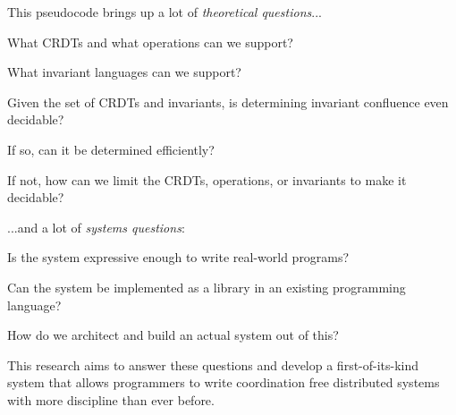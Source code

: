 This pseudocode brings up a lot of \emph{theoretical questions}...
\begin{inparaitem}
  \item What CRDTs and what operations can we support?
  \item What invariant languages can we support?
  \item Given the set of CRDTs and invariants, is determining invariant
    confluence even decidable?
  \item If so, can it be determined efficiently?
  \item If not, how can we limit the CRDTs, operations, or invariants to make
    it decidable?
\end{inparaitem}
...and a lot of \emph{systems questions}:
\begin{inparaitem}
  \item Is the system expressive enough to write real-world programs?
  \item Can the system be implemented as a library in an existing programming
    language?
  \item How do we architect and build an actual system out of this?
\end{inparaitem}

This research aims to answer these questions and develop a first-of-its-kind
system that allows programmers to write coordination free distributed systems
with more discipline than ever before.
